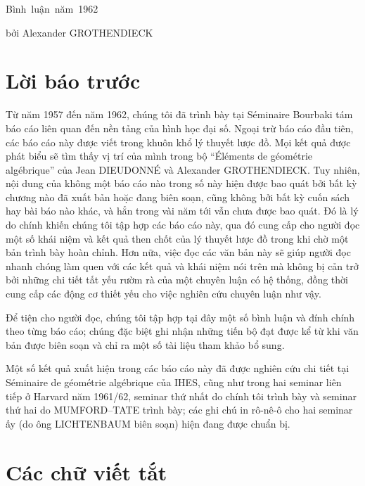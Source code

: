 \unit{Bình luận năm 1962}
%
  {bởi Alexander GROTHENDIECK}

\section*{Lời báo trước}

Từ năm 1957 đến năm 1962, chúng tôi đã trình bày tại Séminaire Bourbaki tám
báo cáo liên quan đến nền tảng của hình học đại số. Ngoại trừ báo cáo đầu
tiên, các báo cáo này được viết trong khuôn khổ lý thuyết lược đồ. Mọi kết quả
được phát biểu sẽ tìm thấy vị trí của mình trong bộ ``Éléments de géométrie
algébrique'' của Jean DIEUDONNÉ và Alexander GROTHENDIECK. Tuy nhiên, nội dung
của không một báo cáo nào trong số này hiện được bao quát bởi bất kỳ chương
nào đã xuất bản hoặc đang biên soạn, cũng không bởi bất kỳ cuốn sách hay bài
báo nào khác, và hẳn trong vài năm tới vẫn chưa được bao quát. Đó là lý do
chính khiến chúng tôi tập hợp các báo cáo này, qua đó cung cấp cho người đọc
một số khái niệm và kết quả then chốt của lý thuyết lược đồ trong khi chờ một
bản trình bày hoàn chỉnh. Hơn nữa, việc đọc các văn bản này sẽ giúp người đọc
nhanh chóng làm quen với các kết quả và khái niệm nói trên mà không bị cản trở
bởi những chi tiết tất yếu rườm rà của một chuyên luận có hệ thống, đồng thời
cung cấp các động cơ thiết yếu cho việc nghiên cứu chuyên luận như vậy.

Để tiện cho người đọc, chúng tôi tập hợp tại đây một số bình luận và đính
chính theo từng báo cáo; chúng đặc biệt ghi nhận những tiến bộ đạt được kể từ
khi văn bản được biên soạn và chỉ ra một số tài liệu tham khảo bổ sung.

Một số kết quả xuất hiện trong các báo cáo này đã được nghiên cứu chi tiết tại
Séminaire de géométrie algébrique của IHES, cũng như trong hai seminar liên
tiếp ở Harvard năm 1961/62, seminar thứ nhất do chính tôi trình bày và seminar
thứ hai do MUMFORD--TATE trình bày; các ghi chú in rô-nê-ô cho hai seminar ấy
(do ông LICHTENBAUM biên soạn) hiện đang được chuẩn bị.

\section*{Các chữ viết tắt}

